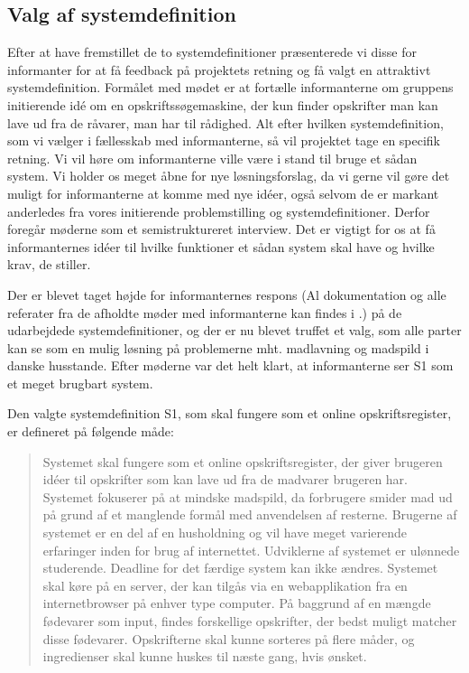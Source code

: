 \subsection{Valg af systemdefinition}
\label{subsec:valgafsystemdefinition}

Efter at have fremstillet de to systemdefinitioner præsenterede vi disse for informanter for at få feedback på projektets retning og få valgt en attraktivt systemdefinition. Formålet med mødet er at fortælle informanterne om gruppens initierende idé om en opskriftssøgemaskine, der kun finder opskrifter man kan lave ud fra de råvarer, man har til rådighed. Alt efter hvilken systemdefinition, som vi vælger i fællesskab med informanterne, så vil projektet tage en specifik retning. Vi vil høre om informanterne ville være i stand til bruge et sådan system. Vi holder os meget åbne for nye løsningsforslag, da vi gerne vil gøre det muligt for informanterne at komme med nye idéer, også selvom de er markant anderledes fra vores initierende problemstilling og systemdefinitioner. Derfor foregår møderne som et semistruktureret interview. Det er vigtigt for os at få informanternes idéer til hvilke funktioner et sådan system skal have og hvilke krav, de stiller.

Der er blevet taget højde for informanternes respons (Al dokumentation og alle referater fra de afholdte møder med informanterne kan findes i .) på de udarbejdede systemdefinitioner, og der er nu blevet truffet et valg, som alle parter kan se som en mulig løsning på problemerne mht. madlavning og madspild i danske husstande. Efter møderne var det helt klart, at informanterne ser S1 som et meget brugbart system. 

Den valgte systemdefinition S1, som skal fungere som et online opskriftsregister, er defineret på følgende måde:

\begin{quote}
Systemet skal fungere som et online opskriftsregister, der giver brugeren idéer til opskrifter som kan lave ud fra de madvarer brugeren har. Systemet fokuserer på at mindske madspild, da forbrugere smider mad ud på grund af et manglende formål med anvendelsen af resterne. Brugerne af systemet er en del af en husholdning og vil have meget varierende erfaringer inden for brug af internettet. Udviklerne af systemet er ulønnede studerende. Deadline for det færdige system kan ikke ændres. Systemet skal køre på en server, der kan tilgås via en webapplikation fra en internetbrowser på enhver type computer. På baggrund af en mængde fødevarer som input, findes forskellige opskrifter, der bedst muligt matcher disse fødevarer. Opskrifterne skal kunne sorteres på flere måder, og ingredienser skal kunne huskes til næste gang, hvis ønsket.
\end{quote}

